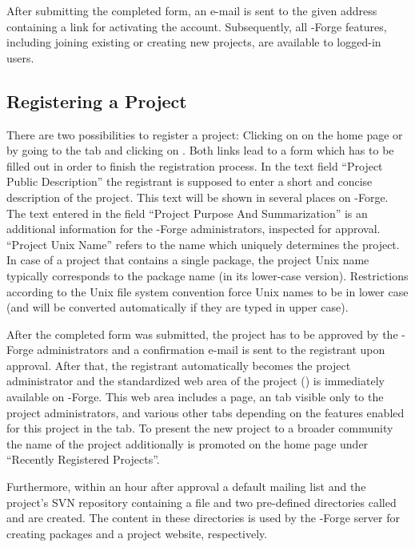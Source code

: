 After submitting the completed form, an e-mail is sent to the given
address containing a link for activating the account. Subsequently,
all \R{}-Forge features, including joining existing or creating
new projects, are available to logged-in users.

\subsection{Registering a Project}

There are two possibilities to register a project: Clicking on
 on the home page or by going to the  tab and clicking on . Both links lead to a
form which has to be filled out in order to finish the registration
process. In the text field ``Project Public Description'' the
registrant is supposed to enter a short and concise description of the
project. This text will be shown in several places on \R{}-Forge. The text
entered in the field ``Project Purpose And Summarization'' is an
additional information for the \R{}-Forge administrators, inspected
for approval. ``Project Unix
Name'' refers to the name which 
uniquely determines the project. In case of a project that contains a
single \R{} package, the project Unix name typically corresponds to
the package name (in its lower-case version). Restrictions according to
the Unix file system convention force Unix names to be in lower case
(and will be converted automatically if they are typed in upper case).

After the completed form was submitted, the project has to be approved
by the \R{}-Forge administrators and a confirmation e-mail is sent to the
registrant upon approval. After that, the registrant automatically
becomes the project administrator and the standardized web area of the
project () is
immediately available on \R{}-Forge. 
This web area includes a  page, an  tab
visible only to the project administrators, and various other tabs
depending on the features enabled for this project in the 
tab. To present the new project to a broader community the name of the
project additionally is promoted on the home page under ``Recently
Registered Projects''.

Furthermore, within an hour after approval a default mailing list and
the project's SVN repository containing a  file and two
pre-defined directories called  and  are created. 
The content in these directories is used by the \R{}-Forge server
for creating \R{} packages and a project website, respectively.


